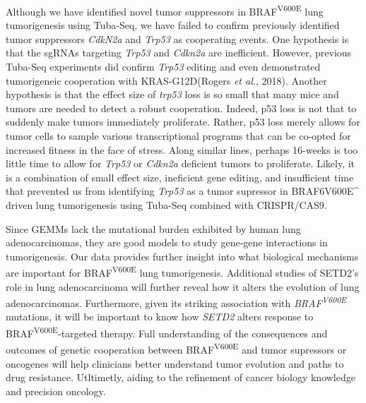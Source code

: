 Although we have identified novel tumor suppressors in BRAF\textsuperscript{V600E} lung tumorigenesis using Tuba-Seq, we have failed to confirm previously identified tumor suppressors \emph{CdkN2a} and \emph{Trp53} as cooperating events. One hypothesis is that the sgRNAs targeting \emph{Trp53} and \emph{Cdkn2a} are inefficient. However, previous Tuba-Seq experiments did confirm \emph{Trp53} editing and even demonstrated tumorigeneic cooperation with KRAS-G12D(Rogers \emph{et al.}, 2018). Another hypothesis is that the effect size of \emph{trp53} loss is so small that many mice and tumors are needed to detect a robust cooperation. Indeed, p53 loss is not that to suddenly make tumors immediately proliferate. Rather, p53 loss merely allows for tumor cells to sample various transcriptional programs that can be co-opted for increased fitness in the face of stress. Along similar lines, perhaps 16-weeks is too little time to allow for \emph{Trp53} or \emph{Cdkn2a} deficient tumors to proliferate. Likely, it is a combination of small effect size, ineficient gene editing, and insufficient time that prevented us from identifying \emph{Trp53} as a tumor supressor in BRAF6V600E\^{} driven lung tumorigenesis using Tuba-Seq combined with CRISPR/CAS9.

Since GEMMs lack the mutational burden exhibited by human lung adenocarcinomas, they are good models to study gene-gene interactions in tumorigenesis. Our data provides further insight into what biological mechanisms are important for BRAF\textsuperscript{V600E} lung tumorigenesis. Additional studies of SETD2's role in lung adenocarcinoma will further reveal how it alters the evolution of lung adenocarcinomas. Furthermore, given its striking association with \emph{BRAF\textsuperscript{V600E}} mutations, it will be important to know how \emph{SETD2} alters response to BRAF\textsuperscript{V600E}-targeted therapy. Full understanding of the consequences and outcomes of genetic cooperation between BRAF\textsuperscript{V600E} and tumor supressors or oncogenes will help clinicians better understand tumor evolution and paths to drug resistance. Utltimetly, aiding to the refinement of cancer biology knowledge and precision oncology.

